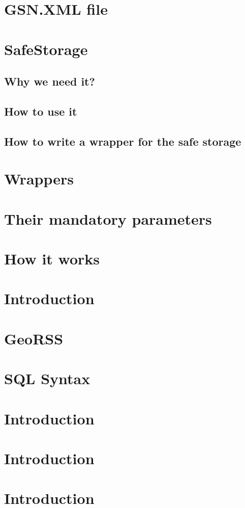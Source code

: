 \documentclass[10pt]{article}
\begin{document}
\section{GSN.XML file}
\section{SafeStorage}
\subsection{Why we need it? }
\subsection{How to use it }
\subsection{How to write a wrapper for the safe storage}
\section{Wrappers}
\section{Their mandatory parameters}
\section{How it works}
\section{Introduction}
\section{GeoRSS}
\section{SQL Syntax}
\section{Introduction}
\section{Introduction}
\section{Introduction}
\end{document}
